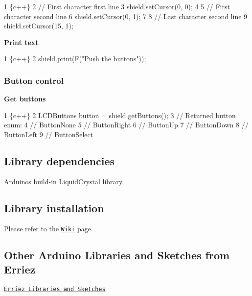 \begin{DoxyCode}
1 \{c++\}
2 // First character first line
3 shield.setCursor(0, 0);
4 
5 // First character second line
6 shield.setCursor(0, 1);
7 
8 // Last character second line
9 shield.setCursor(15, 1);
\end{DoxyCode}


{\bfseries Print text}


\begin{DoxyCode}
1 \{c++\}
2 shield.print(F("Push the buttons"));
\end{DoxyCode}


\subsubsection*{Button control}

{\bfseries Get buttons}


\begin{DoxyCode}
1 \{c++\}
2 LCDButtons button = shield.getButtons();
3 // Returned button enum:
4 //   ButtonNone
5 //   ButtonRight
6 //   ButtonUp
7 //   ButtonDown
8 //   ButtonLeft
9 //   ButtonSelect
\end{DoxyCode}


\subsection*{Library dependencies}


\begin{DoxyItemize}
\item Arduino\textquotesingle{}s build-\/in {\ttfamily Liquid\+Crystal} library.
\end{DoxyItemize}

\subsection*{Library installation}

Please refer to the \href{https://github.com/Erriez/ErriezArduinoLibrariesAndSketches/wiki}{\tt Wiki} page.

\subsection*{Other Arduino Libraries and Sketches from Erriez}


\begin{DoxyItemize}
\item \href{https://github.com/Erriez/ErriezArduinoLibrariesAndSketches}{\tt Erriez Libraries and Sketches} 
\end{DoxyItemize}